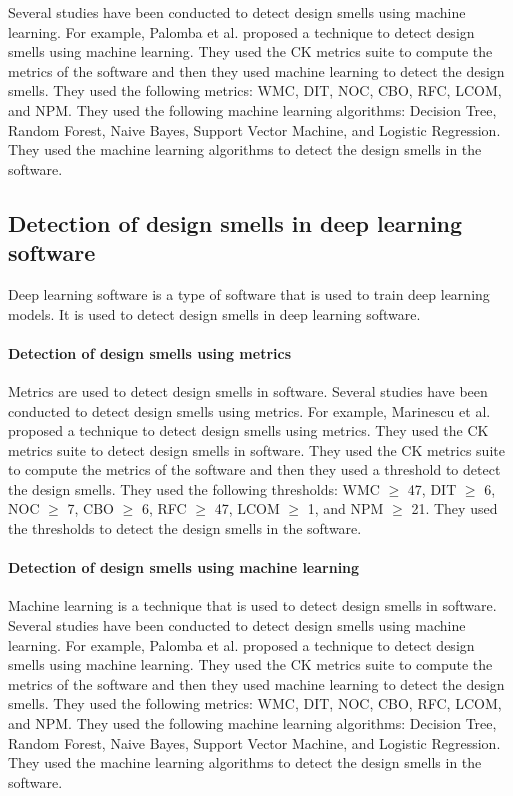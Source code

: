 Several studies have been conducted to detect design smells using machine
learning. For example, Palomba et al. \cite{palomba2017automatic} proposed a
technique to detect design smells using machine learning. They used the CK
metrics suite \cite{chidamber1994metrics} to compute the metrics of the software
and then they used machine learning to detect the design smells. They used the
following metrics: WMC, DIT, NOC, CBO, RFC, LCOM, and NPM. They used the
following machine learning algorithms: Decision Tree, Random Forest, Naive
Bayes,
Support Vector Machine, and Logistic Regression. They used the machine learning
algorithms to detect the design smells in the software.

\subsection{Detection of design smells in deep learning software}
Deep learning software is a type of software that is used to train deep learning
models. It is used to detect design smells in deep learning software.

\paragraph{Detection of design smells using metrics}
Metrics are used to detect design smells in software. Several studies have been
conducted to detect design smells using metrics. For example, Marinescu et al.
\cite{marinescu2004detection} proposed a technique to detect design smells using
metrics. They used the CK
metrics suite \cite{chidamber1994metrics} to detect design smells in software.
They used the CK metrics suite to compute the metrics of the software and then
they used a threshold to detect the design smells. They used the following
thresholds: WMC $\geq$ 47, DIT $\geq$ 6, NOC $\geq$ 7, CBO $\geq$ 6, RFC $\geq$
47, LCOM $\geq$ 1, and NPM $\geq$ 21. They used the thresholds to detect the
design smells in the software.

\paragraph{Detection of design smells using machine learning}
Machine learning is a technique that is used to detect design smells in
software.
Several studies have been conducted to detect design smells using machine
learning. For example, Palomba et al. \cite{palomba2017automatic} proposed a
technique to detect design smells using machine learning. They used the CK
metrics
suite \cite{chidamber1994metrics} to compute the metrics of the software and
then
they used machine learning to detect the design smells. They used the following
metrics: WMC, DIT, NOC, CBO, RFC, LCOM, and NPM. They used the following machine
learning algorithms: Decision Tree, Random Forest, Naive Bayes, Support Vector
Machine, and Logistic Regression. They used the machine learning algorithms to
detect the design smells in the software.

